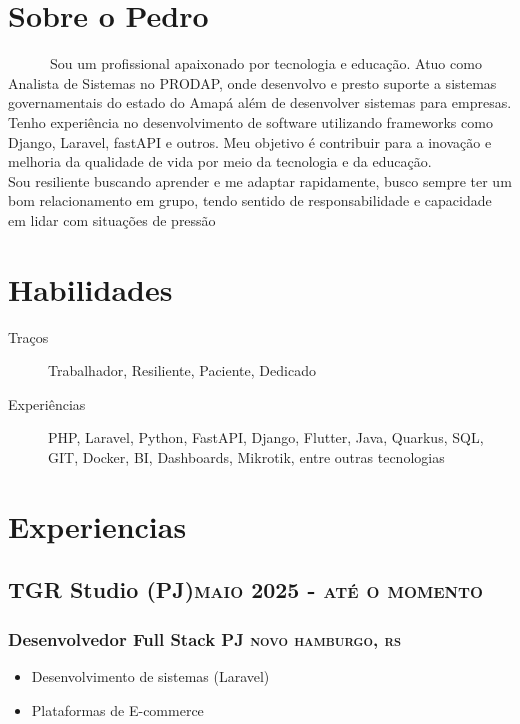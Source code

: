 \documentclass{article}
\newcommand{\rside}[1]{\hfill \normalfont\scshape\MakeLowercase{#1}}
\begin{document}
\section{\faUser\enspace Sobre o Pedro}
\begin{description}
  \item \ \ \ \ \ \  Sou um profissional apaixonado por tecnologia e educação. Atuo como Analista de Sistemas no PRODAP, onde desenvolvo e presto suporte a sistemas governamentais do estado do Amapá além de desenvolver sistemas para empresas. Tenho experiência no desenvolvimento de software utilizando frameworks como Django, Laravel, fastAPI e outros. Meu objetivo é contribuir para a inovação e melhoria da qualidade de vida por meio da tecnologia e da educação. \\ Sou resiliente buscando aprender e me adaptar rapidamente, busco sempre ter um bom relacionamento em grupo, tendo sentido de responsabilidade e capacidade em lidar com situações de pressão
\end{description}

\section{\faCogs\enspace Habilidades}
\begin{description}
  \item[Traços] Trabalhador, Resiliente, Paciente, Dedicado
  \item[Experiências] PHP, Laravel, Python, FastAPI, Django, Flutter, Java, Quarkus, SQL, GIT, Docker, BI, Dashboards, Mikrotik, entre outras tecnologias
\end{description}

\section{\faChartPie\enspace Experiencias}

\subsection{TGR Studio (PJ)\rside{Maio 2025 - Até o momento}}
\subsubsection{Desenvolvedor Full Stack PJ \rside{Novo Hamburgo, RS}}
\begin{itemize}
  \item Desenvolvimento de sistemas (Laravel)
  \item Plataformas de E-commerce
\end{itemize}
\end{document}
